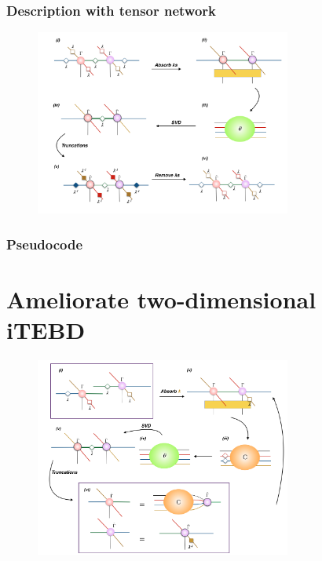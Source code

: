 \subsubsection{Description with tensor network}

	\begin{figure}[ht]
	\centering
	\includegraphics[width=0.75\textwidth]{figures/fig315.png}
	\caption[The tensor network diagrams for the 2-D iTEBD]{}
	\label{fig315}
	\end{figure}

\subsubsection{Pseudocode}

\section{Ameliorate two-dimensional iTEBD}
\label{2dhastin}

	\begin{figure}[ht]
	\centering
	\includegraphics[width=0.75\textwidth]{figures/fig316.png}
	\caption[The tensor network diagrams for the 2-D iTEBD which is ameliorated by Hestins]{}
	\label{fig316}
	\end{figure}

